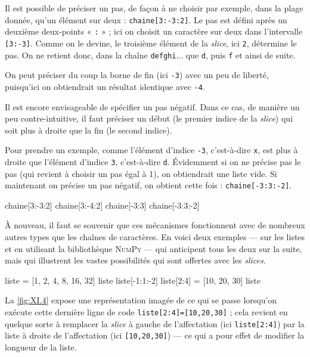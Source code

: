 Il est possible de préciser un pas, de façon à ne choisir par exemple, dans la plage donnée, qu'un élément sur deux : \texttt{chaine[3:-3:2]}. Le pas est défini après un deuxième deux-points « \texttt{:} » ; ici on choisit un caractère sur deux dans l'intervalle \texttt{[3:-3]}. Comme on le devine, le troisième élément de la \textit{slice}, ici \texttt{2}, détermine le pas. On ne retient donc, dans la chaîne \texttt{defghi}... que \texttt{d}, puis \texttt{f} et ainsi de suite.

On peut préciser du coup la borne de fin (ici \texttt{-3}) avec un peu de liberté, puisqu'ici on obtiendrait un résultat identique avec \texttt{-4}.

Il est encore envisageable de spécifier un pas négatif. Dans ce cas, de manière un peu contre-intuitive, il faut préciser un début (le premier indice de la \textit{slice}) qui soit plus à droite que la fin (le second indice).

Pour prendre un exemple, comme l'élément d'indice \texttt{-3}, c'est-à-dire \texttt{x}, est plus à droite que l'élément d'indice \texttt{3}, c'est-à-dire \texttt{d}. Évidemment si on ne précise pas le pas (qui revient à choisir un pas égal à 1), on obtiendrait une liste vide. Si maintenant on précise un pas négatif, on obtient cette fois : \texttt{chaine[-3:3:-2]}.

\begin{idleconsole}
\begin{pyconsole}
chaine[3:-3:2]
chaine[3:-4:2]
chaine[-3:3]
chaine[-3:3:-2]
\end{pyconsole}
\end{idleconsole}

À nouveau, il faut se souvenir que ces mécanismes fonctionnent avec de nombreux autres types que les chaînes de caractères. En voici deux exemples --- sur les listes et en utilisant la bibliothèque \textsc{NumPy} --- qui anticipent tous les deux sur la suite, mais qui illustrent les vastes possibilités qui sont offertes avec les \textit{slices}.

\begin{idleconsole}
\begin{pyconsole}
liste = [1, 2, 4, 8, 16, 32]
liste
liste[-1:1:-2]
liste[2:4] = [10, 20, 30]
liste
\end{pyconsole}
\end{idleconsole}

La \cref{fig:XI.4} expose une représentation imagée de ce qui se passe lorsqu'on exécute cette dernière ligne de code \texttt{liste[2:4]=[10,20,30]} ; cela revient en quelque sorte à remplacer la \textit{slice} à gauche de l'affectation (ici \texttt{liste[2:4]}) par la liste à droite de l'affectation (ici \texttt{[10,20,30]}) --- ce qui a pour effet de modifier la longueur de la liste.


